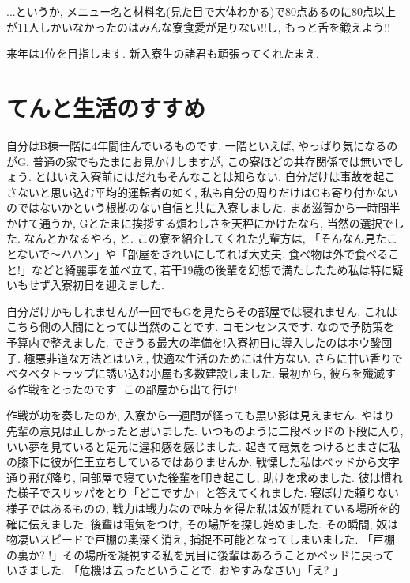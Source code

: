 \documentclass[10pt,b5jsbook,dvips,dvipdfmx,openany]{jsbook}
\theoremstyle{definition}
\begin{document}
		...というか, メニュー名と材料名(見た目で大体わかる)で80点あるのに80点以上が11人しかいなかったのはみんな寮食愛が足りない!!し, もっと舌を鍛えよう!!

		来年は1位を目指します. 新入寮生の諸君も頑張ってくれたまえ.


    \section{てんと生活のすすめ}

    自分はB棟一階に4年間住んでいるものです. 一階といえば, やっぱり気になるのがG.
    普通の家でもたまにお見かけしますが, この寮ほどの共存関係では無いでしょう.
    とはいえ入寮前にはだれもそんなことは知らない.
    自分だけは事故を起こさないと思い込む平均的運転者の如く, 私も自分の周りだけはGも寄り付かないのではないかという根拠のない自信と共に入寮しました. まあ滋賀から一時間半かけて通うか, Gとたまに挨拶する煩わしさを天秤にかけたなら, 当然の選択でした. なんとかなるやろ, と.
    この寮を紹介してくれた先輩方は, 「そんなん見たことないで〜ハハン」や「部屋をきれいにしてれば大丈夫. 食べ物は外で食べること!」などと綺麗事を並べ立て, 若干19歳の後輩を幻想で満たしたため私は特に疑いもせず入寮初日を迎えました.

    自分だけかもしれませんが一回でもGを見たらその部屋では寝れません. これはこちら側の人間にとっては当然のことです. コモンセンスです. なので予防策を予算内で整えました. できうる最大の準備を!入寮初日に導入したのはホウ酸団子. 極悪非道な方法とはいえ, 快適な生活のためには仕方ない. さらに甘い香りでベタベタトラップに誘い込む小屋も多数建設しました. 最初から, 彼らを殲滅する作戦をとったのです. この部屋から出て行け!

    作戦が功を奏したのか, 入寮から一週間が経っても黒い影は見えません. やはり先輩の意見は正しかったと思いました. いつものように二段ベッドの下段に入り, いい夢を見ていると足元に違和感を感じました. 起きて電気をつけるとまさに私の膝下に彼が仁王立ちしているではありませんか. 戦慄した私はベッドから文字通り飛び降り, 同部屋で寝ていた後輩を叩き起こし, 助けを求めました. 彼は慣れた様子でスリッパをとり「どこですか」と答えてくれました. 寝ぼけた頼りない様子ではあるものの, 戦力は戦力なので味方を得た私は奴が隠れている場所を的確に伝えました. 後輩は電気をつけ, その場所を探し始めました. その瞬間, 奴は物凄いスピードで戸棚の奥深く消え, 捕捉不可能となってしまいました. 「戸棚の裏か? !」その場所を凝視する私を尻目に後輩はあろうことかベッドに戻っていきました. 「危機は去ったということで. おやすみなさい」「え? 」
\end{document}

